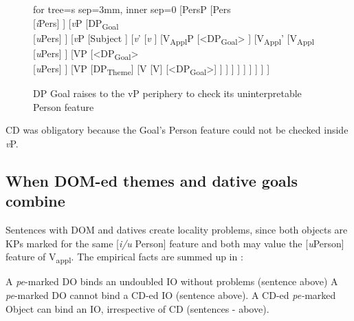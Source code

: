 \documentclass[output=paper,colorlinks,citecolor=brown,nonflat]{langsci/langscibook}
\begin{document}
 \begin{figure}%
 \small
	\begin{forest}
	for tree={s sep=3mm, inner sep=0}
		[PersP
			[Pers\\
				{[}\textit{i}Pers{]}
			]
			[\textit{v}P
				[DP\textsubscript{Goal}\\
					{[}\textit{u}Pers{]}
				]
				[\textit{v}P
					[Subject
					]
					[\textit{v}’
						[\textit{v}
						]
						[V\textsubscript{Appl}P
							[<DP\textsubscript{Goal}>
							]
							[V\textsubscript{Appl}'
								[V\textsubscript{Appl}\\
								 {[}\textit{u}Pers{]}
								]
								[VP
									[<DP\textsubscript{Goal}>\\
									 {[}\textit{u}Pers{]}
									]
									[VP
                                                                                    [DP\textsubscript{Theme}]
                                                                                    [V
                                                                                            [V]
                                                                                            [<DP\textsubscript{Goal}>]
                                                                                    ]
									]
								]
							]
						]
					]
				]
			]
		]
 	\end{forest}
	\caption{\label{fig:cornilescu:10} DP Goal raises to the vP periphery to check its uninterpretable Person feature}
\end{figure}

CD was obligatory because the Goal’s Person feature could not be checked inside \textit{v}P.

\subsection{{When} {DOM-ed} {themes} {and} {dative} {goals} {combine}}%

Sentences with DOM and datives create locality problems, since both objects are KPs marked for the same [\textit{i/u} Person] feature and both may value the [\textit{u}Person] feature of V\textsubscript{appl}. The empirical facts are summed up in :

\ea%
   \label{ex:cornilescu:30}
  	\ea A \textit{pe}-marked DO binds an undoubled IO without problems (sentence  above) \label{ex:cornilescu:30a}
  	\ex A \textit{pe}-marked DO cannot bind a CD-ed IO (sentence  above). \label{ex:cornilescu:30b}
  	\ex A CD-ed \textit{pe-}marked Object can bind an IO, irrespective of CD (sentences - above). \label{ex:cornilescu:30c}
   \z
   \z
\end{document}
